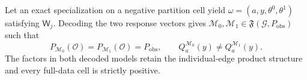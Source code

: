 Let an exact specialization on a negative partition cell yield \(\omega=(a,y,\theta^0,\theta^1)\) satisfying \(\mathsf W_j\). Decoding the two response vectors gives \(\mathcal M_0,\mathcal M_1\in\mathfrak F(\mathcal G,P_{\mathrm{obs}})\) such that
\[
P_{\mathcal M_0}(\mathcal O)=P_{\mathcal M_1}(\mathcal O)=P_{\mathrm{obs}},
\qquad
Q_a^{\mathcal M_0}(y)\neq Q_a^{\mathcal M_1}(y).
\]
The factors in both decoded models retain the individual-edge product structure and every full-data cell is strictly positive.
